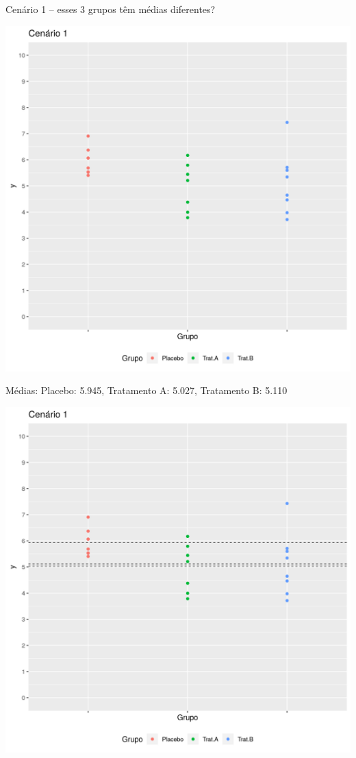 \documentclass{beamer}
\begin{document}
\begin{frame}[label=cenario1]{\small Cenário 1 -- esses 3 grupos têm médias diferentes?}
  \begin{center}
    \includegraphics[height=.9\textheight]{Cap13-30/cenario1}
  \end{center}
\end{frame}

\begin{frame}{\footnotesize Médias: Placebo: 5.945, Tratamento A: 5.027, Tratamento B: 5.110}
  \begin{center}
    \includegraphics[height=.9\textheight]{Cap13-30/cenario1_medias}

  \end{center}
\end{frame}
\end{document}
